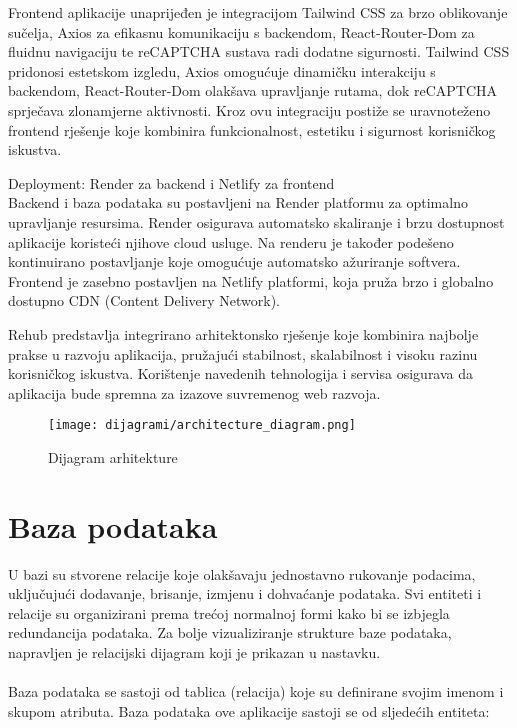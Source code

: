 \begin{packed_item}
	Frontend aplikacije unaprijeđen je integracijom Tailwind CSS za brzo oblikovanje sučelja, Axios za efikasnu komunikaciju s backendom, React-Router-Dom za fluidnu navigaciju te reCAPTCHA sustava radi dodatne sigurnosti. Tailwind CSS pridonosi estetskom izgledu, Axios omogućuje dinamičku interakciju s backendom, React-Router-Dom olakšava upravljanje rutama, dok reCAPTCHA sprječava zlonamjerne aktivnosti. Kroz ovu integraciju postiže se uravnoteženo frontend rješenje koje kombinira funkcionalnost, estetiku i sigurnost korisničkog iskustva. \\
	\large \item Deployment: Render za backend i Netlify za frontend \normalsize \\
	Backend i baza podataka su postavljeni na Render platformu za optimalno upravljanje resursima. Render osigurava automatsko skaliranje i brzu dostupnost aplikacije koristeći njihove cloud usluge. Na renderu je također podešeno kontinuirano postavljanje koje omogućuje automatsko ažuriranje softvera. Frontend je zasebno postavljen na Netlify platformi, koja pruža brzo i globalno dostupno CDN (Content Delivery Network). \\
\end{packed_item}

Rehub predstavlja integrirano arhitektonsko rješenje koje kombinira najbolje prakse u razvoju aplikacija, pružajući stabilnost, skalabilnost i visoku razinu korisničkog iskustva. Korištenje navedenih tehnologija i servisa osigurava da aplikacija bude spremna za izazove suvremenog web razvoja.




\begin{figure}[H]
	\texttt{[image: dijagrami/architecture\_diagram.png]}
	\centering
	\caption{Dijagram arhitekture}
	\label{fig:architecture_diagram}
\end{figure}

\section{Baza podataka}

U bazi su stvorene relacije koje olakšavaju jednostavno rukovanje podacima, uključujući dodavanje, brisanje, izmjenu i dohvaćanje podataka. Svi entiteti i relacije su organizirani prema trećoj normalnoj formi kako bi se izbjegla redundancija podataka. Za bolje vizualiziranje strukture baze podataka, napravljen je relacijski dijagram koji je prikazan u nastavku. \\
\\
Baza podataka se sastoji od tablica (relacija) koje su definirane svojim imenom i skupom
atributa. Baza podataka ove aplikacije sastoji se od sljedećih entiteta:

